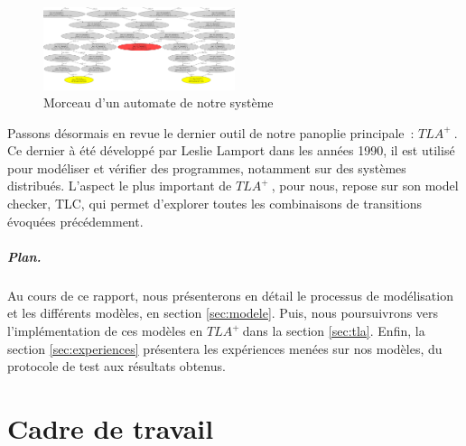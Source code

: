 \documentclass[oneside, a4paper, 11pt]{book}
\newcommand{\TLA}{\ensuremath{TLA^+~}}
\begin{document}
\begin{figure}
	\centering
	\includegraphics[width=0.5\textwidth]{collision.jpg}
	\caption{Morceau d'un automate de notre système}
	\label{fig:zoomCollision}
\end{figure}

\noindent
Passons désormais en revue le dernier outil de notre panoplie principale~: \TLA. 
Ce dernier à été développé par Leslie Lamport dans les années 1990, il est utilisé pour modéliser et vérifier des programmes, notamment sur des systèmes distribués. 
L'aspect le plus important de \TLA, pour nous, repose sur son model checker, TLC, qui permet d'explorer toutes les combinaisons de transitions évoquées précédemment.
\\
\paragraph{Plan.} Au cours de ce rapport, nous présenterons en détail le processus de modélisation et les différents modèles, en section \ref{sec:modele}. Puis, nous poursuivrons vers l'implémentation de ces modèles en \TLA dans la section \ref{sec:tla}.
Enfin, la section \ref{sec:experiences} présentera les expériences menées sur nos modèles, du protocole de test aux résultats obtenus.










\chapter{Cadre de travail}
\end{document}
